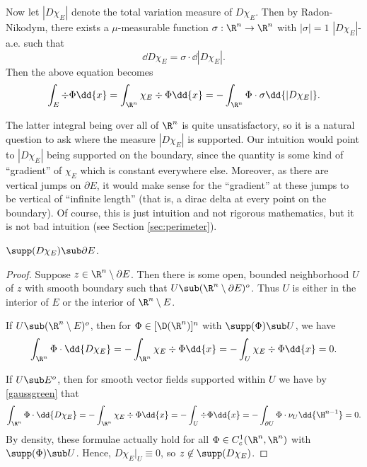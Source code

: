 \documentclass[../main.tex]{subfiles}
\begin{document}
Now let $ |D \chi_{E}| $ denote the total variation measure of $ D \chi_{E} $. Then by Radon-Nikodym, there exists a $ \mu $-measurable function $ \sigma:\R^{n}\to \R^{n} $ with $ | \sigma | = 1 $ $ |D \chi_{E}| $-a.e. such that 
\[
    \dd{D \chi_{E}} = \sigma\cdot \dd{|D \chi_{E}|}.
\]
Then the above equation becomes
\[
    \int_{E} \div{\Phi} \dd{x} = \int_{\R^{n}} \chi_{E} \div{\Phi} \dd{x} = -\int_{\R^{n}} \Phi\cdot \sigma \dd{|D \chi_{E}|}.
\]

The latter integral being over all of $ \R^{n} $ is quite unsatisfactory, so it is a natural question to ask where the measure  $ |D \chi_{E}| $ is supported. Our intuition would point to $ |D \chi_{E}| $ being supported on the boundary, since the quantity is some kind of ``gradient'' of $ \chi_{E} $ which is constant everywhere else. Moreover, as there are vertical jumps on $ \partial E $, it would make sense for the ``gradient'' at these jumps to be vertical of ``infinite length'' (that is, a dirac delta at every point on the boundary). Of course, this is just intuition and not rigorous mathematics, but it is not bad intuition (see Section \ref{sec:perimeter}).

\begin{claim}
    $ \supp(D \chi_{E}) \sub \partial E $.
\end{claim}

\begin{proof}
    Suppose $ z\in \R^{n}\setminus \partial E $. Then there is some open, bounded neighborhood $ U $ of $ z $ with smooth boundary such that $ U\sub (\R^{n}\setminus \partial E)^{o} $. Thus $ U $ is either in the interior of $ E $ or the interior of $ \R^{n}\setminus E $. 

    If $ U\sub (\R^{n}\setminus E)^{o} $, then for $ \Phi\in [\D(\R^{n})]^{n} $ with $ \supp(\Phi)\sub U $, we have
    \[ 
        \int_{\R^{n}} \Phi\cdot \dd{D \chi_{E}} = -\int_{\R^{n}}\chi_{E} \div{\Phi} \dd{x} = -\int_{U} \chi_{E}\div{\Phi}\dd{x} = 0.
    \]

    If $ U\sub E^{o} $, then for smooth vector fields supported within $ U $ we have by \eqref{gaussgreen} that
    \[
        \int_{\R^{n}} \Phi\cdot \dd{D \chi_{E}} = -\int_{\R^{n}}\chi_{E} \div{\Phi} \dd{x} = -\int_{U} \div{\Phi}\dd{x} = -\int_{\partial U} \Phi\cdot \nu_{U} \dd{\H^{n-1}} = 0.
    \]
    By density, these formulae actually hold for all $ \Phi\in C^{1}_{c} (\R^{n},\R^{n}) $ with $ \supp(\Phi)\sub U $. Hence, $ D\chi_{E}\vert_{U} \equiv 0 $, so $ z\not\in \supp(D\chi_{E}) $.
\end{proof}
\end{document}

